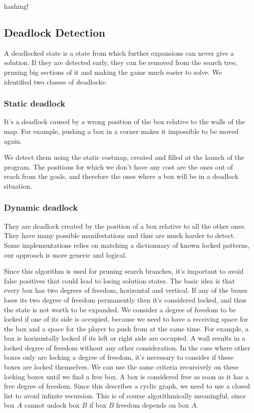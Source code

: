 \documentclass[a4paper,11pt]{article}
\begin{document}
hashing!

\subsection{Deadlock Detection}

A deadlocked state is a state from which further expansions can never give a
solution. If they are detected early, they can be removed from the search tree,
pruning big sections of it and making the game much easier to solve. We 
identified two classes of deadlocks:

\subsubsection{Static deadlock}

It's a deadlock caused by a wrong position of the box relative to the walls of
the map. For example, pushing a box in a corner makes it impossible to be moved
again. 

We detect them using the static costmap, created and filled at the launch of
the program. The positions for which we don't have any cost are the ones out
of reach from the goals, and therefore the ones where a box will be in a 
deadlock situation.

\subsubsection{Dynamic deadlock}

They are deadlock created by the position of a box relative to all the
other ones. They have many possible manifestations and thus are much
harder to detect. Some implementations relies on matching a
dictionnary of known locked patterns, our approach is more generic and
logical.

Since this algorithm is used for pruning search branches, it's
important to avoid false positives that could lead to losing solution
states. The basic idea is that every box has two degrees of freedom,
horizontal and vertical. If any of the boxes loses its two degree of
freedom permanently then it's considered locked, and thus the state is
not worth to be expanded. We consider a degree of freedom to be locked
if one of its side is occupied, because we need to have a receiving
space for the box and a space for the player to push from at the same
time. For example, a box is horizontally locked if its left or right
side are occupied. A wall results in a locked degree of freedom
without any other consideration. In the case where other boxes only
are locking a degree of freedom, it's necessary to consider if these
boxes are locked themselves. We can use the same criteria recursively
on these locking boxes until we find a free box. A box is considered
free as soon as it has a free degree of freedom. Since this describes
a cyclic graph, we need to use a closed list to avoid infinite
recursion. This is of course algorithmically meaningful, since box $A$
cannot unlock box $B$ if box $B$ freedom depends on box $A$.
\end{document}
